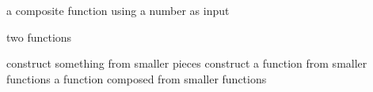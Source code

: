 \documentclass[fleqn,letterpaper,12pt,printwatermark=false]{memoir}
\begin{document}
\newcommand{\myClassName}{Pre-AP Algebra 2}
\newcommand{\myUnitNumber}{1}
\newcommand{\myUnitTitle}{Introduction to Functions}
\newcommand{\myLessonNumber}{8}
\newcommand{\myLessonTitle}{Composing Functions}



\pagestyle{myPagestyle}

\checkandfixthelayout
{}

\begin{myNotesHeader}
    \item {} a composite function using a number as input
    \item {} two functions
\end{myNotesHeader}

\begin{myVocabulary}
        {
            construct something from smaller pieces
        }
        {
            construct a function from smaller functions
        }
        {
            a function composed from smaller functions
        }
\end{myVocabulary}
\end{document}
